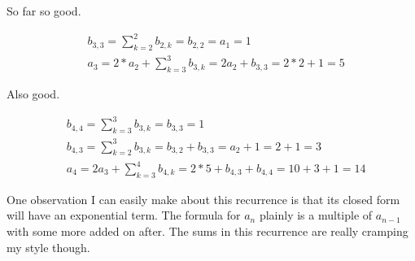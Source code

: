 \documentclass{article}
\begin{document}
So far so good.

\begin{align*}
  &b_{3,3} = \sum_{k=2}^{2} b_{2,k} = b_{2,2} = a_1 = 1 \\
  &a_3 = 2 * a_2 + \sum_{k=3}^{3} b_{3,k} = 2a_2 + b_{3,3} = 2 * 2 + 1 = 5
\end{align*}

Also good.

\begin{align*}
  &b_{4,4} = \sum_{k=3}^{3} b_{3,k} = b_{3,3} = 1 \\
  &b_{4,3} = \sum_{k=2}^{3} b_{3,k} = b_{3,2} + b_{3,3} = a_2 + 1 = 2 + 1 = 3 \\
  &a_4 = 2 a_{3} + \sum_{k=3}^{4} b_{4,k} = 2 * 5 + b_{4,3} + b_{4,4} = 10 + 3 + 1 = 14
\end{align*}

One observation I can easily make about this recurrence is that its closed form will have an exponential term.  The formula for $a_n$ plainly is a multiple of $a_{n-1}$ with some more added on after.  The sums in this recurrence are really cramping my style though.
\end{document}
